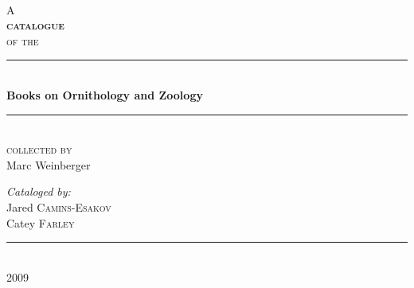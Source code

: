 \begin{titlepage}
 
\begin{center}
 
 
~\\[1cm]
{\small A}\\[0.5cm]

\textsc{\huge\bfseries catalogue}\\[0.5cm]
 
\textsc{\small of the}\\[0.5cm]
 
 
\rule{\linewidth}{0.5mm}\\[0.4cm]
{ \huge \bfseries Books on Ornithology and Zoology}\\[0.4cm]

\rule{\linewidth}{0.5mm}\\[0.5cm]

\textsc{\small collected by}\\[0.5cm]

{\selectfont\LARGE Marc Weinberger}\\[1.5cm]
 
\begin{flushleft} \large
\emph{Cataloged by:}\\
Jared \textsc{Camins-Esakov}\\
Catey \textsc{Farley}\\
\end{flushleft}
 
\vfill
 
\rule{6cm}{0.25mm}\\[0.2cm]

{\large 2009}
 
\end{center}
 
\end{titlepage}

